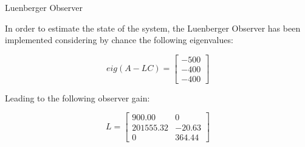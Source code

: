 \begin{frame}{Luenberger Observer}

    In order to estimate the state of the system\footnotemark[1], the Luenberger Observer has been implemented considering by chance the following eigenvalues:

    \begin{equation}
        eig(A-LC) =
        \begin{bmatrix}
            -500 \\
            -400 \\
            -400
        \end{bmatrix}
        \label{eq:luenberger_observer_poles}
    \end{equation}

    Leading to the following observer gain:

    \begin{equation}
        L =
        \begin{bmatrix}
            900.00    & 0      \\
            201555.32 & -20.63 \\
            0         & 364.44
        \end{bmatrix}
        \label{eq:L_luemberg}
    \end{equation}


\end{frame}



